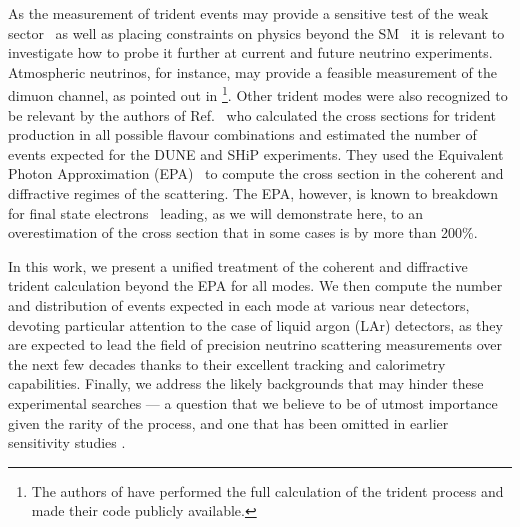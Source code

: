 As the measurement of trident events may provide a sensitive test of the weak sector~\cite{Brown:1973ih} as well as placing constraints on physics beyond the SM~\cite{Mishra:1991bv,Gaidaenko:2000hg,Altmannshofer:2014pba,Kaneta:2016uyt,Ge2017,Magill:2017mps,Falkowski:2018dmy} it is relevant to investigate how to probe it further at current and future neutrino experiments. Atmospheric neutrinos, for instance, may provide a feasible measurement of the dimuon channel, as pointed out in \footnote{The authors of  have performed the full calculation of the trident process and made their code publicly available.}. Other trident modes were also re\-cog\-ni\-zed to be relevant by the authors of Ref.~\cite{Magill:2016hgc} who calculated the cross sections for trident production in all possible flavour combinations and estimated the number of events expected for the DUNE and SHiP experiments. They used the Equivalent Photon Approximation (EPA)~\cite{Belusevic:1987cw} to compute the cross section in the coherent and diffractive regimes of the scattering. The EPA, however, is known to breakdown for final state electrons~\cite{Kozhushner:1962aa, Shabalin:1963aa, Czyz:1964zz} leading, as we will demonstrate here, to an overestimation of the cross section that in some cases is by more than 200\%. 

In this work, we present a unified treatment of the coherent and diffractive trident calculation beyond the EPA for all modes. We then compute the number and distribution of events expected in each mode at various near detectors, devoting particular attention to the case of liquid argon (LAr) detectors, as they are expected to lead the field of precision neutrino scattering measurements over the next few decades thanks to their excellent tracking and calorimetry capabilities. Finally, we address the likely backgrounds that may hinder these experimental searches --- a question that we believe to be of utmost importance given the rarity of the process, and one that has been omitted in earlier sensitivity studies \cite{Magill:2016hgc,Altmannshofer:2014pba}. 

